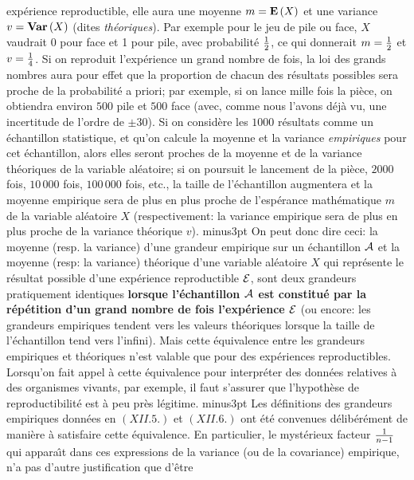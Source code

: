 exp\'erience reproductible, elle aura une moyenne $m = {\bf E}\, (X)$
et une variance $v = {\bf Var}\, (X)$ (dites {\it th\'eoriques}). Par 
exemple pour le jeu de pile ou face, $X$ vaudrait 0 pour face et 1 pour 
pile, avec probabilit\'e $1 \over 2$, ce qui donnerait $m = {1 \over 2}$ 
et $v = {1 \over 4}$. Si on reproduit l'exp\'erience un grand nombre de 
fois, la loi des grands nombres aura pour effet que la proportion de 
chacun des r\'esultats possibles sera proche de la probabilit\'e a 
priori; par exemple, si on lance mille fois la pi\`ece, on obtiendra 
environ $500$ pile et $500$ face (avec, comme nous l'avons d\'ej\`a
vu, une incertitude de l'ordre de $\pm 30$). Si on consid\`ere les
$1000$ r\'esultats comme un \'echantillon statistique, et qu'on calcule 
la moyenne et la variance {\it empiriques} pour cet \'echantillon, alors 
elles seront proches de la moyenne et de la variance th\'eoriques de la 
variable al\'eatoire; si on poursuit le lancement de la pi\`ece, $2000$
fois, $10\, 000$ fois, $100\, 000$ fois, etc., la taille de l'\'echantillon 
augmentera et la moyenne empirique sera de plus en plus proche de 
l'esp\'erance math\'ematique $m$ de la variable al\'eatoire $X$ 
(respectivement: la variance empirique sera de plus en plus proche de
la variance th\'eorique $v$). 
 minus3pt 
On peut donc dire ceci: la moyenne (resp. la variance) d'une grandeur 
empirique sur un \'echantillon ${\cal A}$ et la moyenne (resp: la
variance) th\'eorique d'une variable al\'eatoire $X$ qui repr\'esente le 
r\'esultat possible d'une exp\'erience reproductible ${\cal E}$, sont 
deux grandeurs pratiquement identiques {\bf lorsque l'\'echantillon 
${\cal A}$ est constitu\'e par la r\'ep\'etition d'un grand nombre de 
fois l'exp\'erience ${\cal E}$} (ou encore: les grandeurs empiriques 
tendent vers les valeurs th\'eoriques lorsque la taille de l'\'echantillon 
tend vers l'infini). Mais cette \'equivalence entre les grandeurs 
empiriques et th\'eoriques n'est va\-lable que pour des exp\'eriences 
reproductibles. Lorsqu'on fait appel \`a cette \'equivalence pour 
interpr\'eter des donn\'ees relatives \`a des organismes vivants,  par 
exemple, il faut s'assurer que l'hypoth\`ese de reproductibilit\'e est 
\`a peu pr\`es l\'egitime. 
 minus3pt 
Les d\'efinitions des grandeurs empiriques donn\'ees en $(XII.5.)$ et 
$(XII.6.)$ ont \'et\'e convenues d\'elib\'er\'ement de mani\`ere \`a
satisfaire cette \'equivalence. En particulier, le myst\'erieux facteur
$1 \over n-1$ qui appara{\^\i}t dans ces expressions de la variance (ou
de la covariance) empirique, n'a pas d'autre justification que d'\^etre

